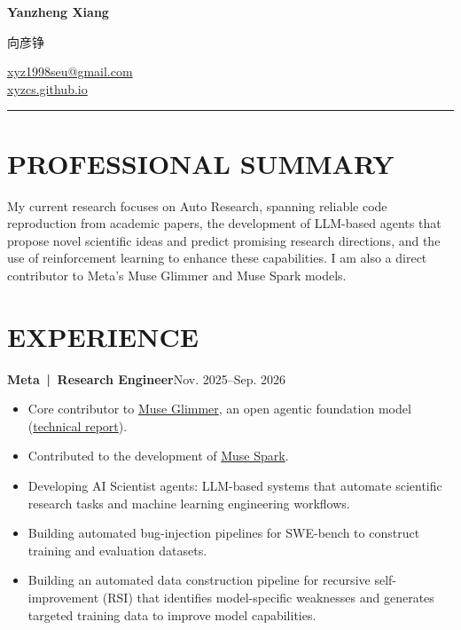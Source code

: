 \documentclass[UTF8,11pt,a4paper,fontset=none]{ctexart}
\begin{document}
\noindent
\begin{minipage}[t]{0.54\textwidth}
  {\fontsize{25}{29}\selectfont\bfseries Yanzheng Xiang}\par
  \vspace{0.17em}
  {\small\color{muted}向彦铮}
\end{minipage}\hfill
\begin{minipage}[t]{0.43\textwidth}
  \raggedleft\small
  \href{mailto:xyz1998seu@gmail.com}{xyz1998seu@gmail.com}\\
  \href{https://xyzcs.github.io/}{xyzcs.github.io}
\end{minipage}
\par\vspace{0.72em}
{\color{rulegray}\rule{\textwidth}{0.65pt}}

\section*{PROFESSIONAL SUMMARY}
My current research focuses on Auto Research, spanning reliable code reproduction from academic papers, the development of LLM-based agents that propose novel scientific ideas and predict promising research directions, and the use of reinforcement learning to enhance these capabilities. I am also a direct contributor to Meta's Muse Glimmer and Muse Spark models.

\section*{EXPERIENCE}
\textbf{Meta \,|\, Research Engineer}\hfill Nov. 2025--Sep. 2026
\begin{itemize}
  \item Core contributor to \href{https://research.meta.ai/blog/introducing-muse-glimmer-open-agentic-model}{Muse Glimmer}, an open agentic foundation model (\href{https://xyzcs.github.io/files/muse-glimmer-technical-report.pdf}{technical report}).
  \item Contributed to the development of \href{https://ai.meta.com/blog/introducing-muse-spark-msl/}{Muse Spark}.
  \item Developing AI Scientist agents: LLM-based systems that automate scientific research tasks and machine learning engineering workflows.
  \item Building automated bug-injection pipelines for SWE-bench to construct training and evaluation datasets.
  \item Building an automated data construction pipeline for recursive self-improvement (RSI) that identifies model-specific weaknesses and generates targeted training data to improve model capabilities.
\end{itemize}
\end{document}
